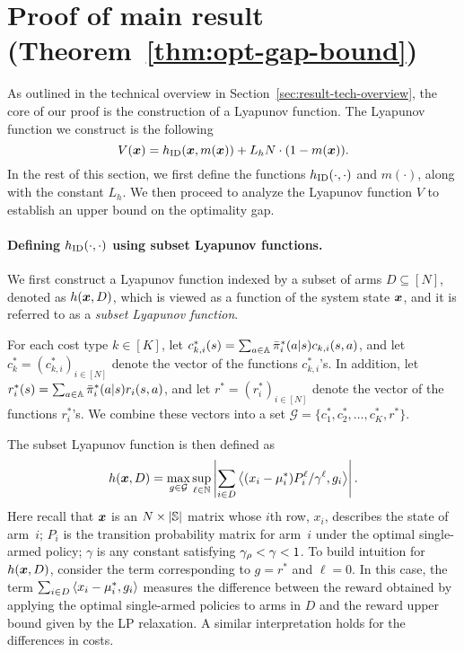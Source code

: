 \documentclass[11pt,letterpaper]{article}
\begin{document}
\section{Proof of main result (Theorem~\ref{thm:opt-gap-bound})}
\label{sec:proof-main-mainbody}

As outlined in the technical overview in Section~\ref{sec:result-tech-overview}, the core of our proof is the construction of a Lyapunov function.
The Lyapunov function we construct is the following
\begin{equation}
    \label{eq:main-lyapunov-def}
    V(\bm{x}) = h_{\textnormal{ID}}(\bm{x},m(\bm{x}))+L_hN\cdot(1-m(\bm{x})).
\end{equation}
In the rest of this section, we first define the functions $h_{\textnormal{ID}}(\cdot,\cdot)$ and $m(\cdot)$, along with the constant $L_h$.
We then proceed to analyze the Lyapunov function $V$ to establish an upper bound on the optimality gap.

\paragraph{Defining $h_{\textnormal{ID}}(\cdot,\cdot)$ using subset Lyapunov functions.}
We first construct a Lyapunov function indexed by a subset of arms $D\subseteq [N]$, denoted as $h(\bm{x},D)$, which is viewed as a function of the system state $\bm{x}$, and it is referred to as a \emph{subset Lyapunov function}.

For each cost type $k\in[K]$, let $c_{k,i}^*(s)=\sum_{a\in\mathbb{A}} \bar{\pi}_i^*(a|s)c_{k,i}(s,a)$,
and let $c_{k}^*=(c_{k,i}^*)_{i\in[N]}$ denote the vector of the functions $c_{k,i}^*$'s.
In addition, let $r_i^*(s)=\sum_{a\in\mathbb{A}}\bar{\pi}_i^*(a|s)r_i(s,a)$,
and let $r^*=(r_i^*)_{i\in[N]}$ denote the vector of the functions $r_i^*$'s.  We combine these vectors into a set $\mathcal{G}=\{c_1^*,c_2^*,\dots,c_K^*,r^*\}$.

The subset Lyapunov function is then defined as
\begin{equation}\label{eq:h-def}
    h(\bm{x},D) = \max_{g\in \mathcal{G}} \sup_{\ell\in\mathbb{N}} \left\lvert\sum_{i\in D} \left\langle (x_i-\mu_i^*) P_i^{\ell} / \gamma^{\ell}, g_i \right\rangle\right\rvert.
\end{equation}
Here recall that $\bm{x}$ is an $N\times\lvert\mathbb{S}\rvert$ matrix whose $i$th row, $x_i$, describes the state of arm~$i$; $P_i$ is the transition probability matrix for arm~$i$ under the optimal single-armed policy; $\gamma$ is any constant satisfying $\gamma_{\rho} < \gamma < 1$.
To build intuition for $h(\bm{x},D)$, consider the term corresponding to $g=r^*$ and $\ell = 0$.
In this case, the term $\sum_{i\in D}\left\langle x_i-\mu_i^*, g_i \right\rangle$ measures the difference between the reward obtained by applying the optimal single-armed policies to arms in $D$ and the reward upper bound given by the LP relaxation.
A similar interpretation holds for the differences in costs.
\end{document}
